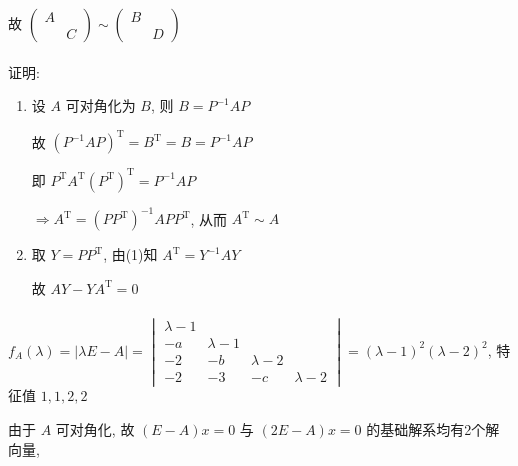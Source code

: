          故 \( \begin{pmatrix}
             A &   \\
               & C
         \end{pmatrix} \sim \begin{pmatrix}
             B &   \\
               & D
         \end{pmatrix} \)


     \paragraph{} %
         证明:
         \begin{enumerate}
             \item %
                   设 \( A \) 可对角化为 \( B \), 则 \( B = P^{-1}AP \)

                   故 \( (P^{-1}AP)^{\mathrm{T}} = B^{\mathrm{T}} = B = P^{-1}AP \)

                   即 \( P^{\mathrm{T}}A^{\mathrm{T}}(P^{\mathrm{T}})^{\mathrm{T}} = P^{-1}AP \)

                   \( \Rightarrow A^{\mathrm{T}} = (PP^{\mathrm{T}})^{-1}APP^{\mathrm{T}} \), 从而 \( A^{\mathrm{T}} \sim A \)
             \item %
                   取 \( Y = PP^{\mathrm{T}} \), 由(1)知 \( A^{\mathrm{T}} = Y^{-1}AY \)

                   故 \( AY - YA^{\mathrm{T}} = 0 \)
         \end{enumerate}


     \paragraph{} %
         \( f_{A}(\lambda) = |\lambda E - A| = \begin{vmatrix}
             \lambda - 1 &             &             &           \\
             -a          & \lambda - 1 &             &           \\
             -2          & -b          & \lambda - 2 &           \\
             -2          & -3          & -c          & \lambda-2
         \end{vmatrix} = (\lambda - 1)^{2}(\lambda - 2)^{2} \), 特征值 \( 1, 1, 2, 2 \)

         由于 \( A \) 可对角化, 故 \( (E - A)x = 0 \) 与 \( (2E - A)x = 0 \) 的基础解系均有2个解向量,

